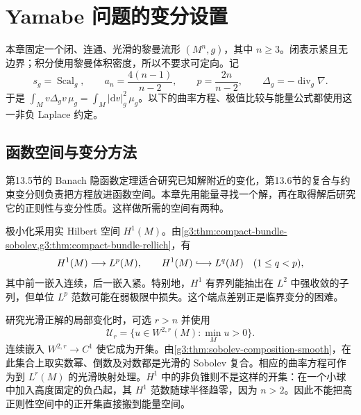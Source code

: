 
% 
% 
% 

\section{Yamabe 问题的变分设置}
\label{g3:sec:2401}

本章固定一个闭、连通、光滑的黎曼流形 \((M^n,g)\)，其中 \(n\ge3\)。闭表示紧且无边界；积分使用黎曼体积密度，所以不要求可定向。记
\[
	s_g=\operatorname{Scal}_g,\qquad
	a_n=\frac{4(n-1)}{n-2},\qquad p=\frac{2n}{n-2},\qquad
	\Delta_g=-\operatorname{div}_g\nabla.
\]
于是 \(\int_M v\Delta_gv\,\mu_g=\int_M|\mathrm dv|_g^2\,\mu_g\)。以下的曲率方程、极值比较与能量公式都使用这一非负 Laplace 约定。

\subsection{函数空间与变分方法}
\label{g3:subsec:2401:01}
第13.5节的 Banach 隐函数定理适合研究已知解附近的变化，第13.6节的复合与约束变分则负责把方程放进函数空间。本章先用能量寻找一个解，再在取得解后研究它的正则性与变分性质。这样做所需的空间有两种。

\ProseParagraphBreak
极小化采用实 Hilbert 空间 \(H^1(M)\)。由\cref{g3:thm:compact-bundle-sobolev,g3:thm:compact-bundle-rellich}，有
\[
	H^1(M)\longrightarrow L^p(M),\qquad
	H^1(M)\lhook\joinrel\longrightarrow L^q(M)\quad(1\le q<p),
\]
其中前一嵌入连续，后一嵌入紧。特别地，\(H^1\) 有界列能抽出在 \(L^2\) 中强收敛的子列，但单位 \(L^p\) 范数可能在弱极限中损失。这个端点差别正是临界变分的困难。

\ProseParagraphBreak
研究光滑正解的局部变化时，可选 \(r>n\) 并使用
\[
	\mathcal U_r=\{u\in W^{2,r}(M):\min_Mu>0\}.
\]
连续嵌入 \(W^{2,r}\to C^1\) 使它成为开集。由\cref{g3:thm:sobolev-composition-smooth}，在此集合上取实数幂、倒数及对数都是光滑的 Sobolev 复合。相应的曲率方程可作为到 \(L^r(M)\) 的光滑映射处理。\(H^1\) 中的非负锥则不是这样的开集：在一个小球中加入高度固定的负凸起，其 \(H^1\) 范数随球半径趋零，因为 \(n>2\)。因此不能把高正则性空间中的正开集直接搬到能量空间。

